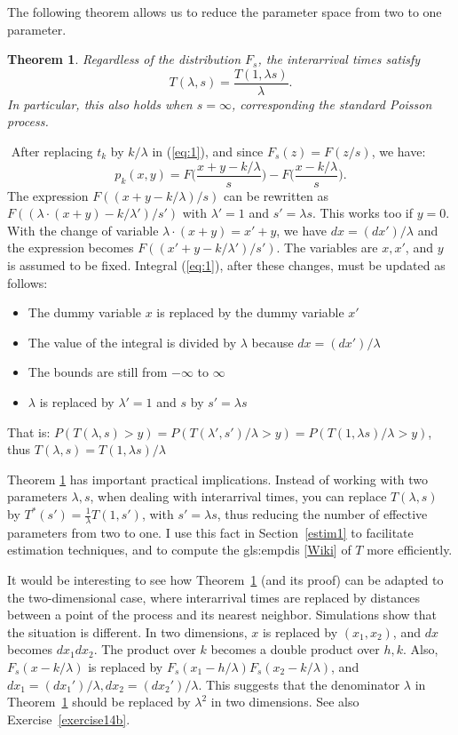 \documentclass[10pt]{article}
\newtheorem{theorem}{Theorem}[section]
\newenvironment{proof}[1][Proof]{\begin{trivlist}
\item[\hskip \labelsep {\bfseries #1}]}{\end{trivlist}}
\newcommand{\qed}{\nobreak \ifvmode \relax \else
      \ifdim\lastskip<1.5em \hskip-\lastskip
      \hskip1.5em plus0em minus0.5em \fi \nobreak
      \vrule height0.75em width0.5em depth0.25em\fi}
\begin{document}
The following theorem allows us to reduce the parameter space from two to one parameter.

\begin{theorem}
\label{sums}
Regardless of the distribution $F_s$, the interarrival times satisfy 
$$T(\lambda,s)=\frac{T(1,\lambda s)}{\lambda}.$$
In particular, this also holds when $s=\infty$, corresponding the standard Poisson process.
\end{theorem}
\begin{proof}
$ $ \newline 
After replacing $t_k$ by $k/\lambda$ in (\ref{eq:1}), and since $F_s(z)=F(z/s)$,  we have: 
$$p_k(x,y) = F\Big(\frac{x+y-k/\lambda}{ s}\Big)-F\Big(\frac{ x-k/\lambda}{s}\Big).$$
The expression $F((x+y-k/\lambda)/ s)$ can be rewritten as 
$F((\lambda\cdot(x+y)-k/\lambda')/ s')$ with $\lambda'=1$ and $s'=\lambda s$. This works too if $y=0$. With the change of variable $\lambda\cdot(x+y)=x'+y$, we have $dx = (dx')/\lambda$ and the expression becomes $F((x'+y-k/\lambda')/ s')$. The variables are $x,x'$, and $y$ is assumed to be fixed. 
Integral (\ref{eq:1}), after these changes,  must be updated as follows:
\begin{itemize}
 \item The dummy variable $x$ is replaced by the dummy variable $x'$
 \item The value of the integral is divided by $\lambda$ because $dx =  (dx')/\lambda$
 \item The bounds are still from $-\infty$ to $\infty$
 \item $\lambda$ is replaced by $\lambda'=1$ and $s$ by $s'=\lambda s$
\end{itemize}
That is: $P(T(\lambda,s)>y) = P(T(\lambda',s')/\lambda>y) =P(T(1,\lambda s)/\lambda >y)$, thus
$T(\lambda,s)=T(1,\lambda s)/\lambda$ \qed
\end{proof}

Theorem \ref{sums} has important practical implications. Instead of working with two parameters $\lambda, s$, when dealing with interarrival times, you can replace $T(\lambda,s)$ by $T^*(s')=\frac{1}{\lambda}T(1,s')$, with $s'=\lambda s$, thus reducing the number of effective parameters from two to one. I use this fact in Section~\ref{estim1} to facilitate estimation techniques, and to compute the  \gls{gls:empdis} [\href{https://en.wikipedia.org/wiki/Empirical_distribution_function}{Wiki}]  of $T$ more efficiently.

It would be interesting to see how Theorem~\ref{sums} (and its proof) can be adapted to the two-dimensional case, where interarrival times are replaced by 
distances between a point of the process and its \textcolor{index}{nearest neighbor}. Simulations show that the situation is different. 
In two dimensions, $x$ is replaced by $(x_1,x_2)$, and $dx$ becomes $dx_1 dx_2$. The product over $k$ becomes a double product over $h,k$. Also, $F_s(x-k/\lambda)$ is replaced by $F_s(x_1-h/\lambda)F_s(x_2-k/\lambda)$, and $dx_1 = (dx_1')/\lambda, dx_2 = (dx_2')/\lambda$. This suggests that the denominator $\lambda$ 
in Theorem~\ref{sums} should be replaced by $\lambda^2$ in two dimensions. See also Exercise~\ref{exercise14b}.
\end{document}

